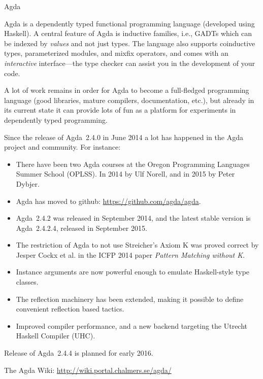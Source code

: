 \documentclass{article}
\begin{document}
\begin{hcarentry}{Agda}
\label{agda}
\makeheader

Agda is a dependently typed functional programming language (developed
using Haskell). A central feature of Agda is inductive families,
i.e., GADTs which can be indexed by \emph{values} and not just types.
The language also supports coinductive types, parameterized modules,
and mixfix operators, and comes with an \emph{interactive}
interface---the type checker can assist you in the development of your
code.

A lot of work remains in order for Agda to become a full-fledged
programming language (good libraries, mature compilers, documentation,
etc.), but already in its current state it can provide lots of fun as
a platform for experiments in dependently typed programming.

Since the release of Agda~2.4.0 in June 2014 a lot has happened in the Agda
project and community. For instance:
\begin{itemize}
\item There have been two Agda courses at the Oregon Programming Languages
Summer School (OPLSS). In 2014 by Ulf Norell, and in 2015 by Peter Dybjer.
\item Agda has moved to github: \url{https://github.com/agda/agda}.
\item Agda~2.4.2 was released in September 2014, and the latest stable
version is Agda~2.4.2.4, released in September 2015.
\item The restriction of Agda to not use Streicher's Axiom K was proved
correct by Jesper Cockx et al. in the ICFP 2014 paper {\em Pattern Matching
without K}.
\item Instance arguments are now powerful enough to emulate Haskell-style
type classes.
\item The reflection machinery has been extended, making it possible to
define convenient reflection based tactics.
\item Improved compiler performance, and a new backend targeting the
Utrecht Haskell Compiler (UHC).
\end{itemize}
Release of Agda~2.4.4 is planned for early 2016.

\FurtherReading
  The Agda Wiki: \url{http://wiki.portal.chalmers.se/agda/}
\end{hcarentry}
\end{document}
